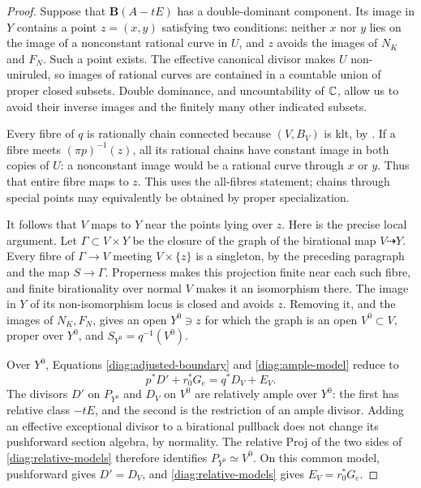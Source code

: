 \begin{proof}
Suppose that $\mathbf B(A-tE)$ has a double-dominant component.  Its
image in $Y$ contains a point $z=(x,y)$ satisfying two conditions:
neither $x$ nor $y$ lies on the image of a nonconstant rational curve in
$U$, and $z$ avoids the images of $N_K$ and $F_N$.  Such a point exists.
The effective canonical divisor makes $U$ non-uniruled, so images of
rational curves are contained in a countable union of proper closed
subsets.  Double dominance, and uncountability of $\mathbb C$, allow us to
avoid their inverse images and the finitely many other indicated
subsets.

Every fibre of $q$ is rationally chain connected because $(V,B_V)$ is
klt, by
\citep[Corollary~1.6]{HM2007}.  If a fibre meets $(\pi p)^{-1}(z)$,
all its rational chains have constant image in both copies of $U$:
a nonconstant image would be a rational curve through $x$ or $y$.
Thus that entire fibre maps to $z$.  This uses the all-fibres statement;
chains through special points may equivalently be obtained by proper
specialization.

It follows that $V$ maps to $Y$ near the points lying over $z$.  Here
is the precise local argument.  Let $\Gamma\subset V\times Y$ be the
closure of the graph of the birational map $V\dashrightarrow Y$.
Every fibre of $\Gamma\to V$ meeting $V\times\{z\}$ is a singleton,
by the preceding paragraph and the map $S\to\Gamma$.  Properness makes
this projection finite near each such fibre, and finite birationality
over normal $V$ makes it an isomorphism there.  The image in $Y$ of its
non-isomorphism locus is closed and avoids $z$.  Removing it, and the
images of $N_K,F_N$, gives an open $Y^0\ni z$ for which the graph is an
open $V^0\subset V$, proper over $Y^0$, and
$S_{Y^0}=q^{-1}(V^0)$.

Over $Y^0$, Equations \eqref{diag:adjusted-boundary} and
\eqref{diag:ample-model} reduce to
\begin{equation}\label{diag:relative-models}
 p^*D'+r_0^*G_e=q^*D_V+E_V.
\end{equation}
The divisors $D'$ on $P_{Y^0}$ and $D_V$ on $V^0$ are relatively ample
over $Y^0$: the first has relative class $-tE$, and the second is the
restriction of an ample divisor.  Adding an effective exceptional
divisor to a birational pullback does not change its pushforward
section algebra, by normality.  The relative Proj of the two sides of
\eqref{diag:relative-models} therefore identifies
$P_{Y^0}\simeq V^0$.  On this common model, pushforward gives
$D'=D_V$, and \eqref{diag:relative-models} gives
$E_V=r_0^*G_e$.


\end{proof}
